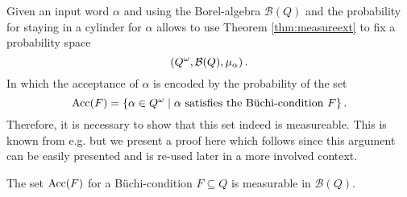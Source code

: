 Given an input word $\alpha$ and using the Borel-algebra $\mathcal{B}(Q)$ and 
the probability for staying in a cylinder for $\alpha$ allows to use Theorem
\ref{thm:measureext} to fix a probability space
\begin{equation*}
  \left(Q^{\omega}, \mathcal{B}(Q), \mu_{\alpha}\right).
\end{equation*}
In which the acceptance of $\alpha$ is encoded by the probability of the set
\begin{equation*}
  \operatorname{Acc}(F) = \left\{
    \alpha\in Q^{\omega}\mid\alpha\text{ satisfies the Büchi-condition }F\right\}.
\end{equation*}
Therefore, it is necessary to show that this set indeed is measureable. This is
known from e.g. \cite[Chapter 4.1.1.]{Groesser} but we present a proof here
which follows \cite[Proposition 6]{RandAutoInfTrees} since this argument can be
easily presented and is re-used later in a more involved context.
\begin{lemma}[Measurability]
  The set $\operatorname{Acc}(F)$ for a Büchi-condition $F\subseteq Q$ is measurable in 
  $\mathcal{B}(Q)$.
  \label{lem:measureabilityAcceptance}
\end{lemma}
